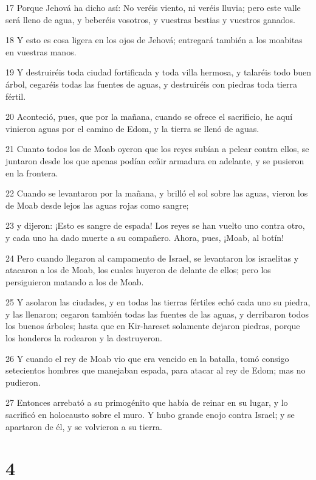 \par 17 Porque Jehová ha dicho así: No veréis viento, ni veréis lluvia; pero este valle será lleno de agua, y beberéis vosotros, y vuestras bestias y vuestros ganados.
\par 18 Y esto es cosa ligera en los ojos de Jehová; entregará también a los moabitas en vuestras manos.
\par 19 Y destruiréis toda ciudad fortificada y toda villa hermosa, y talaréis todo buen árbol, cegaréis todas las fuentes de aguas, y destruiréis con piedras toda tierra fértil.
\par 20 Aconteció, pues, que por la mañana, cuando se ofrece el sacrificio, he aquí vinieron aguas por el camino de Edom, y la tierra se llenó de aguas.
\par 21 Cuanto todos los de Moab oyeron que los reyes subían a pelear contra ellos, se juntaron desde los que apenas podían ceñir armadura en adelante, y se pusieron en la frontera.
\par 22 Cuando se levantaron por la mañana, y brilló el sol sobre las aguas, vieron los de Moab desde lejos las aguas rojas como sangre;
\par 23 y dijeron: ¡Esto es sangre de espada! Los reyes se han vuelto uno contra otro, y cada uno ha dado muerte a su compañero. Ahora, pues, ¡Moab, al botín!
\par 24 Pero cuando llegaron al campamento de Israel, se levantaron los israelitas y atacaron a los de Moab, los cuales huyeron de delante de ellos; pero los persiguieron matando a los de Moab.
\par 25 Y asolaron las ciudades, y en todas las tierras fértiles echó cada uno su piedra, y las llenaron; cegaron también todas las fuentes de las aguas, y derribaron todos los buenos árboles; hasta que en Kir-hareset solamente dejaron piedras, porque los honderos la rodearon y la destruyeron.
\par 26 Y cuando el rey de Moab vio que era vencido en la batalla, tomó consigo setecientos hombres que manejaban espada, para atacar al rey de Edom; mas no pudieron.
\par 27 Entonces arrebató a su primogénito que había de reinar en su lugar, y lo sacrificó en holocausto sobre el muro. Y hubo grande enojo contra Israel; y se apartaron de él, y se volvieron a su tierra.

\chapter{4}

